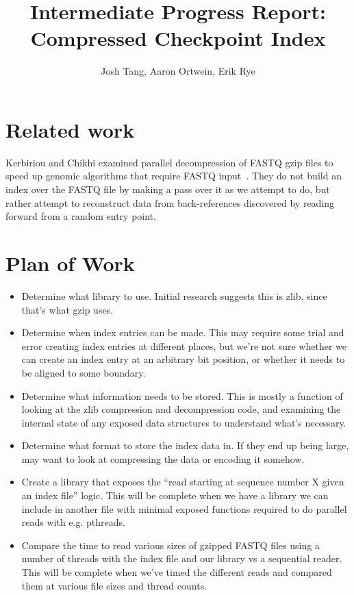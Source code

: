 \documentclass[10pt]{article}
\title{Intermediate Progress Report:\\ Compressed Checkpoint Index}
\author{Josh Tang, Aaron Ortwein, Erik Rye}
\begin{document}
\maketitle
\section{Related work}

Kerbiriou and Chikhi examined parallel decompression of FASTQ gzip files to
speed up genomic algorithms that require FASTQ
input~\cite{kerbiriou2019parallel}. They do not build an index over the FASTQ
file by making a pass over it as we attempt to do, but rather attempt to
reconstruct data from back-references discovered by reading forward from a
random entry point.

\section{Plan of Work}

\begin{itemize}

\item Determine what library to use. Initial research suggests this is zlib,
    since that's what gzip uses.
\item Determine when index entries can be made. This may require some trial and
    error creating index entries at different places, but we're not sure whether
        we can create an index entry at an arbitrary bit position, or whether it
        needs to be aligned to some boundary. 
\item Determine what information needs to be stored. This is mostly a function
    of looking at the zlib compression and decompression code, and examining the
    internal state of any exposed data structures to understand what's
        necessary. 
\item Determine what format to store the index data in. If they end up being
    large, may want to look at compressing the data or encoding it somehow.   
\item Create a library that exposes the ``read starting at sequence number
        X given an index file'' logic. This will be complete when we have a
        library we can include in another file with minimal exposed functions
        required to do parallel reads with e.g. pthreads.
\item Compare the time to read various sizes of gzipped FASTQ files using a
    number of threads with the index file and our library vs a sequential
        reader. This will be complete when we've timed the different reads and
        compared them at various file sizes and thread counts.
\end{itemize}
\end{document}
